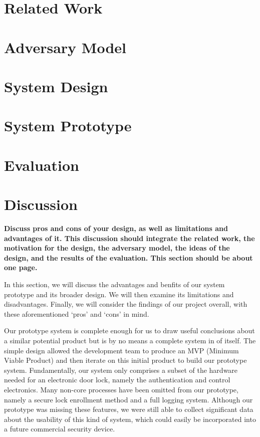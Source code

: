 \documentclass[conference]{IEEEtran}
\begin{document}
\section{Related Work}

\section{Adversary Model}

\section{System Design}

\section{System Prototype}

\section{Evaluation}
\newpage
\section{Discussion}
\textbf{Discuss pros and cons of your design, as well as limitations and advantages of it. This discussion should integrate the related work, the motivation for the design, the adversary model, the ideas of the design, and the results of the evaluation. This section should be about one page.}
\newline

In this section, we will discuss the advantages and benfits of our system prototype and its broader design.
We will then examine its limitations and disadvantages.
Finally, we will consider the findings of our project overall, with these aforementioned `pros' and `cons' in mind.

Our prototype system is complete enough for us to draw useful conclusions about a similar potential product but is by no means a complete system in of itself.
The simple design allowed the development team to produce an MVP (Minimum Viable Product) and then iterate on this initial product to build our prototype system.
Fundamentally, our system only comprises a subset of the hardware needed for an electronic door lock, namely the authentication and control electronics.
Many non-core processes have been omitted from our prototype, namely a secure lock enrollment method and a full logging system.
Although our prototype was missing these features, we were still able to collect significant data about the usability of this kind of system, which could easily be incorporated into a future commercial security device.
\end{document}
